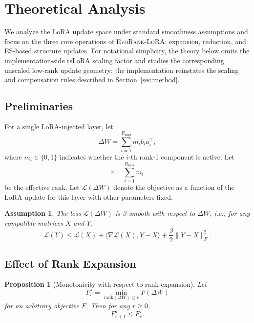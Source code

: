 \documentclass{article}
\newtheorem{proposition}{Proposition}
\newtheorem{assumption}{Assumption}
\newcommand{\method}{\textsc{EvoRank-LoRA}}
\newcommand{\Rmax}{R_{\max}}
\begin{document}
\section{Theoretical Analysis}
\label{sec:theory}

We analyze the LoRA update space under standard smoothness assumptions and focus on the three core operations of \method: expansion, reduction, and ES-based structure updates. For notational simplicity, the theory below omits the implementation-side rsLoRA scaling factor and studies the corresponding unscaled low-rank update geometry; the implementation reinstates the scaling and compensation rules described in Section~\ref{sec:method}.

\subsection{Preliminaries}
For a single LoRA-injected layer, let
\begin{equation}
    \Delta W = \sum_{i=1}^{\Rmax} m_i b_i a_i^\top,
\end{equation}
where $m_i \in \{0,1\}$ indicates whether the $i$-th rank-1 component is active. Let
\begin{equation}
    r = \sum_{i=1}^{\Rmax} m_i
\end{equation}
be the effective rank. Let $\mathcal{L}(\Delta W)$ denote the objective as a function of the LoRA update for this layer with other parameters fixed.

\begin{assumption}
\label{ass:smoothness}
The loss $\mathcal{L}(\Delta W)$ is $\beta$-smooth with respect to $\Delta W$, i.e., for any compatible matrices $X$ and $Y$,
\begin{equation}
\mathcal{L}(Y) \le \mathcal{L}(X) + \langle \nabla \mathcal{L}(X), Y-X \rangle + \frac{\beta}{2}\|Y-X\|_F^2.
\end{equation}
\end{assumption}

\subsection{Effect of Rank Expansion}
\begin{proposition}[Monotonicity with respect to rank expansion]
\label{prop:rank_monotonicity}
Let
\begin{equation}
    F_r^\star = \min_{\mathrm{rank}(\Delta W) \le r} F(\Delta W)
\end{equation}
for an arbitrary objective $F$. Then for any $r \ge 0$,
\begin{equation}
    F_{r+1}^\star \le F_r^\star.
\end{equation}
\end{proposition}
\end{document}
